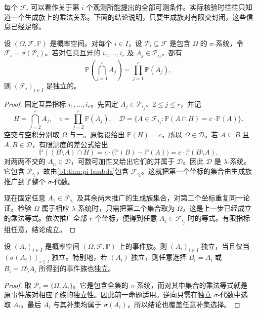 每个 \(\mathcal F_i\) 可以看作关于第 \(i\) 个观测所能提出的全部可测条件。实际核验时往往只知道一个生成族上的乘法关系。下面的结论说明，只要生成族对有限交封闭，这些信息已经足够。

\begin{proposition}[独立性的生成族判据]\label{b1:prop:30-independent-pi-lambda}
设 \((\Omega,\mathcal F,\mathbb P)\) 是概率空间。对每个 \(i\in I\)，设 \(\mathcal P_i\subseteq\mathcal F\) 是包含 \(\Omega\) 的 \(\pi\)-系统，令 \(\mathcal F_i=\sigma(\mathcal P_i)\)。若对任意互异的 \(i_1,\ldots,i_r\) 及 \(A_j\in\mathcal P_{i_j}\)，都有
\[
 \mathbb P\left(\bigcap_{j=1}^rA_j\right)
 =\prod_{j=1}^r\mathbb P(A_j),
\]
则 \((\mathcal F_i)_{i\in I}\) 是独立的。
\end{proposition}
\begin{proof}
固定互异指标 \(i_1,\ldots,i_r\)。先固定 \(A_j\in\mathcal P_{i_j}\)、\(2\leq j\leq r\)，并记
\[
 H=\bigcap_{j=2}^rA_j,
 \quad c=\prod_{j=2}^r\mathbb P(A_j),
 \quad \mathcal D=\{A\in\mathcal F_{i_1}:\mathbb P(A\cap H)=c\cdot\mathbb P(A)\}.
\]
空交与空积分别取 \(\Omega\) 与一。原假设给出 \(\mathbb P(H)=c\)，所以 \(\Omega\in\mathcal D\)。若 \(A\subseteq B\) 且 \(A,B\in\mathcal D\)，有限测度的差公式给出
\[
 \mathbb P((B\setminus A)\cap H)
 =c\cdot\bigl(\mathbb P(B)-\mathbb P(A)\bigr)
 =c\cdot\mathbb P(B\setminus A).
\]
对两两不交的 \(A_n\in\mathcal D\)，可数可加性又给出它们的并属于 \(\mathcal D\)。因此 \(\mathcal D\) 是 \(\lambda\)-系统。它包含 \(\mathcal P_{i_1}\)，故由\cref{b1:thm:pi-lambda}包含 \(\mathcal F_{i_1}\)。这就把第一个坐标的集合由生成族推广到了整个 \(\sigma\)-代数。

现在固定任意 \(A_1\in\mathcal F_{i_1}\) 及其余尚未推广的生成族集合，对第二个坐标重复同一论证。检验 \(\Omega\) 属于相应 \(\lambda\)-系统时，只需把第二个集合取为 \(\Omega\)，这是上一步已经成立的乘法等式。依次推广全部 \(r\) 个坐标，便得到任意 \(A_j\in\mathcal F_{i_j}\) 时的等式。有限指标组任意，结论成立。
\end{proof}

\begin{corollary}\label{b1:cor:30-events-generated-sigma}
设 \((A_i)_{i\in I}\) 是概率空间 \((\Omega,\mathcal F,\mathbb P)\) 上的事件族。则 \((A_i)_{i\in I}\) 独立，当且仅当 \((\sigma(A_i))_{i\in I}\) 独立。特别地，若 \((A_i)\) 独立，则任意选择 \(B_i=A_i\) 或 \(B_i=\Omega\setminus A_i\) 所得到的事件族也独立。
\end{corollary}
\begin{proof}
取 \(\mathcal P_i=\{\Omega,A_i\}\)。它是包含全集的 \(\pi\)-系统，而对其中集合的乘法等式就是原事件族对相应子族的独立性。因此前一命题适用。逆向只需在独立 \(\sigma\)-代数中选取 \(A_i\)。最后 \(A_i\) 与其补集均属于 \(\sigma(A_i)\)，所以结论也覆盖任意补集选择。
\end{proof}

